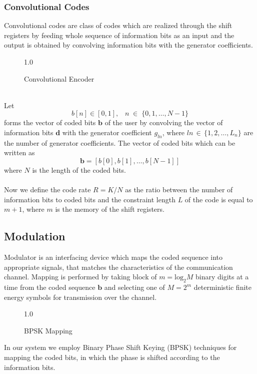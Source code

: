 \subsubsection{Convolutional Codes}
Convolutional codes are class of codes which are realized through the shift registers by feeding whole sequence of information bits as an input and the output is obtained by convolving information bits with the generator coefficients. 
\begin{figure}[htb]
\centerline{  {1.0} }
\caption{Convolutional Encoder}
\end{figure}\\
Let
\begin{equation}
b[n]\in[0,1],\;\;\;n\;\in\;\{0,1,\dots,N-1\}
\end{equation}
forms the vector of coded bits $\mathrm{\mathbf{b}}$ of the user by convolving the vector of information bits $\mathrm{\mathbf{d}}$ with the generator coefficient $g_{ln}$, where $ln\,\in\,\{1,2,\dots,L_n\}$ are the number of generator coefficients.
The vector of coded bits which can be written as
\begin{equation}
\mathrm{\mathbf{b}}=[b[0], b[1],\dots,b[N-1]]
\end{equation}
where $N$ is the length of the coded bits.\\ \\
Now we define the code rate $R=K/N$ as the ratio between the number of information bits to coded bits and the constraint length $L$ of the code is equal to $m+1$, where $m$ is the memory of the shift registers.
\subsection{Modulation}
Modulator is an interfacing device which maps the coded sequence into appropriate signals, that matches the characteristics of the communication channel. Mapping is performed by taking block of $m=\mathrm{log_2}M$ binary digits at a time from the coded sequence $\mathrm{\mathbf{b}}$ and selecting one of $M=2^m$ deterministic finite energy symbols for transmission over the channel.
\begin{figure}[htb]
\centerline{  {1.0} }
\caption{BPSK Mapping}
\end{figure}
In our system we employ Binary Phase Shift Keying (BPSK) techniques for mapping the coded bits, in which the phase is shifted according to the information bits.
